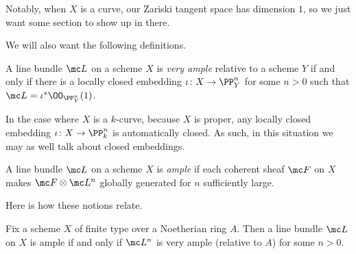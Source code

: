 \documentclass[../notes.tex]{subfiles}
\begin{document}
Notably, when $X$ is a curve, our Zariski tangent space has dimension $1$, so we just want some section to show up in there.

We will also want the following definitions.
\begin{definition}
	A line bundle $\mc L$ on a scheme $X$ is \textit{very ample} relative to a scheme $Y$ if and only if there is a locally closed embedding $\iota\colon X\to\PP^n_Y$ for some $n>0$ such that $\mc L=\iota^*\OO_{\PP^n_Y}(1)$.
\end{definition}
\begin{remark}
	In the case where $X$ is a $k$-curve, because $X$ is proper, any locally closed embedding $\iota\colon X\to\PP^n_k$ is automatically closed. As such, in this situation we may as well talk about closed embeddings.
\end{remark}
\begin{definition}[ample]
	A line bundle $\mc L$ on a scheme $X$ is \textit{ample} if each coherent sheaf $\mc F$ on $X$ makes $\mc F\otimes\mc L^n$ globally generated for $n$ sufficiently large.
\end{definition}
Here is how these notions relate.
\begin{proposition}
	Fix a scheme $X$ of finite type over a Noetherian ring $A$. Then a line bundle $\mc L$ on $X$ is ample if and only if $\mc L^n$ is very ample (relative to $A$) for some $n>0$.
\end{proposition}
\end{document}
